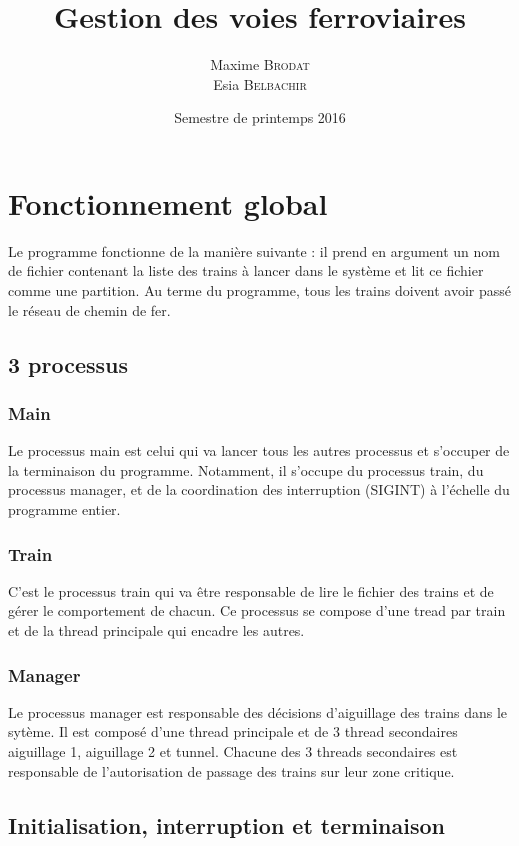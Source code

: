 \documentclass[a4paper,12pt]{article}
\title{Gestion des voies ferroviaires}{Projet de LO41}
\author{Maxime \textsc{Brodat} \\ Esia \textsc{Belbachir}}
\date{Semestre de printemps 2016}
\begin{document}
\maketitlepage

\tableofcontents
\pagebreak


\section{Fonctionnement global}

Le programme fonctionne de la manière suivante : il prend en argument un nom de fichier contenant la liste des trains à lancer dans le système et lit ce fichier comme une partition. Au terme du programme, tous les trains doivent avoir passé le réseau de chemin de fer.

\subsection{3 processus}

\subsubsection{Main}

Le processus main est celui qui va lancer tous les autres processus et s'occuper de la terminaison du programme. Notamment, il s'occupe du processus train, du processus manager, et de la coordination des interruption (SIGINT) à l'échelle du programme entier.

\subsubsection{Train}

C'est le processus train qui va être responsable de lire le fichier des trains et de gérer le comportement de chacun. Ce processus se compose d'une tread par train et de la thread principale qui encadre les autres.

\subsubsection{Manager}

Le processus manager est responsable des décisions d'aiguillage des trains dans le sytème. Il est composé d'une thread principale et de 3 thread secondaires aiguillage 1, aiguillage 2 et tunnel. Chacune des 3 threads secondaires est responsable de l'autorisation de passage des trains sur leur zone critique.

\subsection{Initialisation, interruption et terminaison}
\end{document}
